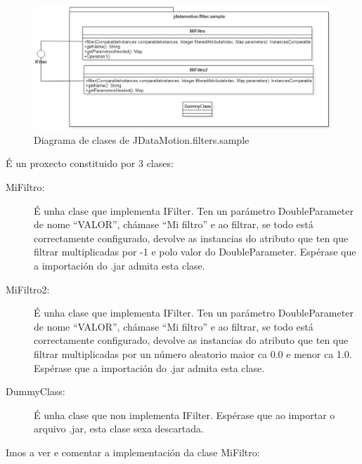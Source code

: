 \begin{figure}
\centering
\includegraphics[width=\textwidth,height=\textheight,keepaspectratio]{figuras/JDataMotionfilterssample}
\caption{Diagrama de clases de JDataMotion.filters.sample}
\label{JDataMotionfilterssample}
\end{figure}

É un proxecto constituido por 3 clases:

\begin{description}
\item[MiFiltro:] \hfill
É unha clase que implementa IFilter. Ten un parámetro DoubleParameter de nome ``VALOR'', chámase ``Mi filtro'' e ao filtrar, se todo está correctamente configurado, devolve as instancias do atributo que ten que filtrar multiplicadas por -1 e polo valor do DoubleParameter. Espérase que a importación do .jar admita esta clase.
\item[MiFiltro2:] \hfill
É unha clase que implementa IFilter. Ten un parámetro DoubleParameter de nome ``VALOR'', chámase ``Mi filtro'' e ao filtrar, se todo está correctamente configurado, devolve as instancias do atributo que ten que filtrar multiplicadas por un número aleatorio maior ca 0.0 e menor ca 1.0. Espérase que a importación do .jar admita esta clase.
\item[DummyClass:] \hfill
É unha clase que non implementa IFilter. Espérase que ao importar o arquivo .jar, esta clase sexa descartada.
\end{description}

Imos a ver e comentar a implementación da clase MiFiltro:

